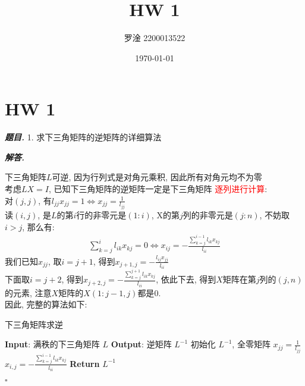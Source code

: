 \documentclass[10pt, a4paper, oneside]{ctexart}
\title{\textbf{HW 1}}
\author{罗淦  2200013522}
\date{\today}
\newenvironment{problem}{\begin{framed}\par\noindent\textbf{\textit{题目. }}}{\end{framed}\par}
\newenvironment{solution}{%
  \par\noindent\textbf{\textit{解答. }}\ignorespaces
}{%
  \hfill\ensuremath{\square}\par %
}
\begin{document}
\maketitle


\section{HW 1}
\begin{problem}
    1. 求下三角矩阵的逆矩阵的详细算法
\end{problem}
\begin{solution}
下三角矩阵$L$可逆, 因为行列式是对角元乘积, 因此所有对角元均不为零\\
考虑$LX=I$, 已知下三角矩阵的逆矩阵一定是下三角矩阵
\textcolor{red}{逐列进行计算}:\\
对$(j,j)$, 有$l_{jj}x_{jj}=1 \iff x_{jj}=\frac{1}{l_{jj}}$\\
读$(i,j)$, 是$L$的第$i$行的非零元是$(1:i)$, X的第$j$列的非零元是$(j:n)$, 不妨取$i>j$, 那么有:
\begin{align*}
    \sum_{k=j}^{i} l_{ik}x_{kj}=0 \iff x_{ij}=-\frac{\sum_{k=j}^{i-1}l_{ik}x_{kj}}{l_{ii}}
\end{align*}
我们已知$x_{jj}$, 取$i=j+1$, 得到$x_{j+1,j}=-\frac{l_{ij}x_{jj}}{l_{ii}}$\\
下面取$i=j+2$, 得到$x_{j+2,j}=-\frac{\sum_{k=j}^{j+1}l_{ik}x_{kj}}{l_{ii}}$, 依此下去, 得到$X$矩阵在第$j$列的$(j,n)$的元素, 注意$X$矩阵的$X(1:j-1, j)$都是$0$.\\
因此, 完整的算法如下:
\begin{algorithm}
    \caption{下三角矩阵求逆}
    \begin{algorithmic}
        \State \textbf{Input}: 满秩的下三角矩阵 \( L \)
        \State \textbf{Output}: 逆矩阵 \( L^{-1} \)
        \State 初始化 \( L^{-1} \), 全零矩阵
        \State $x_{jj}=\frac{1}{l_{jj}}$
            \State $x_{i,j}=-\frac{\sum_{k=j}^{i-1}l_{ik}x_{kj}}{l_{ii}}$
            \EndFor
        \EndFor
        \State \textbf{Return} \( L^{-1} \)
    \end{algorithmic}
    \end{algorithm} 
\end{solution}
\end{document}
